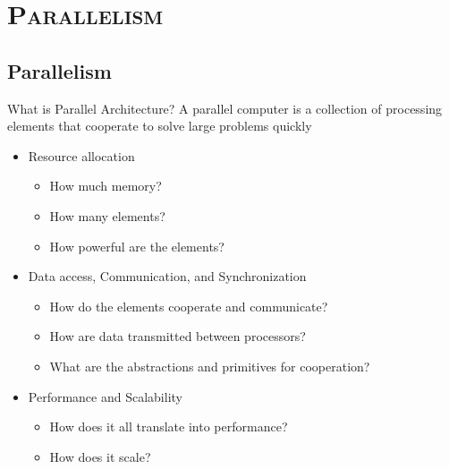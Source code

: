 \documentclass[xcolor=x11names,compress]{beamer}
\renewcommand{\(}{\begin{columns}}
\renewcommand{\)}{\end{columns}}
\newcommand{\<}[1]{\begin{column}{#1}}
\renewcommand{\>}{\end{column}}
\begin{document}
\section{\scshape Parallelism}
\subsection{Parallelism}
\begin{frame}{What is Parallel Architecture?}
A \textcolor{dgreen}{parallel computer} is a collection of processing elements that cooperate to solve large problems
quickly

\begin{itemize}
\item Resource allocation
  \begin{itemize}
  \item How much \textcolor{dgreen}{memory}?
  \item How \textcolor{dgreen}{many} elements?
  \item How \textcolor{dgreen}{powerful} are the elements?
  \end{itemize}
\item Data access, Communication, and Synchronization
  \begin{itemize}
  \item How do the elements cooperate and \textcolor{dgreen}{communicate}?
  \item How are \textcolor{dgreen}{data transmitted} between processors?
  \item What are the \textcolor{dgreen}{abstractions} and primitives for cooperation?
  \end{itemize}
\item Performance and Scalability
  \begin{itemize}
  \item How does it all translate into \textcolor{dgreen}{performance}?
  \item How does it \textcolor{dgreen}{scale}?
  \end{itemize}
\end{itemize}

\end{frame}
\end{document}
